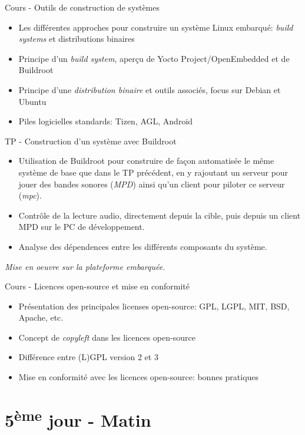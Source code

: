 \documentclass[a4paper,12pt,obeyspaces,spaces,hyphens]{article}
\begin{document}
\feagendatwocolumn
{Cours - Outils de construction de systèmes}
{
  \begin{itemize}
  \item Les différentes approches pour construire un système Linux
    embarqué: {\em build systems} et distributions binaires
  \item Principe d'un {\em build system}, aperçu de Yocto
    Project/OpenEmbedded et de Buildroot
  \item Principe d'une {\em distribution binaire} et outils associés,
    focus sur Debian et Ubuntu
  \item Piles logicielles standards: Tizen, AGL, Android
  \end{itemize}
}
{TP - Construction d'un système avec Buildroot}
{
  \begin{itemize}
  \item Utilisation de Buildroot pour construire de façon automatisée
    le même système de base que dans le TP précédent, en y rajoutant
    un serveur pour jouer des bandes sonores ({\em MPD}) ainsi
    qu'un client pour piloter ce serveur ({\em mpc}).
  \item Contrôle de la lecture audio, directement depuis la
    cible, puis depuis un client MPD sur le PC de développement.
  \item Analyse des dépendences entre les différents composants
    du système.
  \end{itemize}

  \vspace{0.5cm}
  {\em Mise en oeuvre sur la plateforme embarquée.}
}

\feagendaonecolumn
{Cours - Licences open-source et mise en conformité}
{
  \begin{itemize}
  \item Présentation des principales licenses open-source: GPL, LGPL,
    MIT, BSD, Apache, etc.
  \item Concept de {\em copyleft} dans les licences open-source
  \item Différence entre (L)GPL version 2 et 3
  \item Mise en conformité avec les licences open-source: bonnes
    pratiques
  \end{itemize}
}

\section{5\textsuperscript{ème} jour - Matin}
\end{document}

